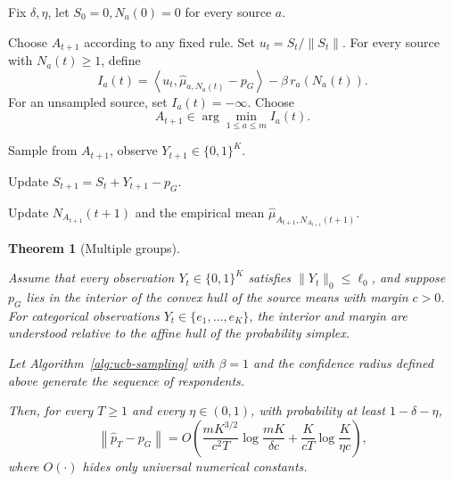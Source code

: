 \documentclass[twoside]{article}
\newtheorem{theorem}{Theorem}
\begin{document}
\begin{algorithm}[t]
\caption{Multi-Source Adaptive Sampling}
\label{alg:ucb-sampling}
\begin{algorithmic}[1]
\STATE Fix $\delta, \eta$, let \(S_0=0, N_a(0)=0\) for every source \(a\).

        \STATE Choose \(A_{t+1}\) according to any fixed rule.
    \ELSE
        \STATE Set $u_t= S_t/\|S_t\|$.
        \STATE For every source with \(N_a(t)\ge1\), define
        \[
            I_a(t)
                =
                \left\langle
                u_t,\widehat\mu_{a,N_a(t)}-p_G
                \right\rangle
                -
                \beta\,r_a\!\left(N_a(t)\right).
                        \]
        For an unsampled source, set \(I_a(t)=-\infty\).
        \STATE Choose
        \[
            A_{t+1}
            \in
            \arg\min_{1\le a\le m} I_a(t).
        \]
    \ENDIF

    \STATE Sample from \(A_{t+1}\), observe
    \(Y_{t+1}\in\{0,1\}^K\).

    \STATE Update $S_{t+1} = S_t+Y_{t+1}-p_G$.

    \STATE Update \(N_{A_{t+1}}(t+1)\) and the empirical mean
    \(\widehat\mu_{A_{t+1},N_{A_{t+1}}(t+1)}\).

\ENDFOR
\end{algorithmic}
\end{algorithm}

\begin{theorem}[Multiple groups]
\label{thm:multidimensional-guarantee}

Assume that every observation \(Y_t\in\{0,1\}^K\) satisfies
\(\|Y_t\|_0\le \ell_0\), and suppose \(p_G\) lies in the
interior of the convex hull of the source means with margin \(c>0\).
For categorical observations \(Y_t\in\{e_1,\ldots,e_K\}\), the interior
and margin are understood relative to the affine hull of the probability
simplex.

Let Algorithm~\ref{alg:ucb-sampling} with \(\beta=1\)  and the confidence
radius defined above generate the sequence of respondents.

Then, for every \(T\ge1\) and every \(\eta\in(0,1)\), with probability at
least \(1-\delta-\eta\),
\[
\left\|\widehat p_T-p_G\right\|
=
O\!\left(
\frac{mK^{3/2}}{c^2T}
\log\frac{mK}{\delta c}
+
\frac{K}{cT}
\log\frac{K}{\eta c}
\right),
\]
where \(O(\cdot)\) hides only universal numerical constants.
\end{theorem}
\end{document}
